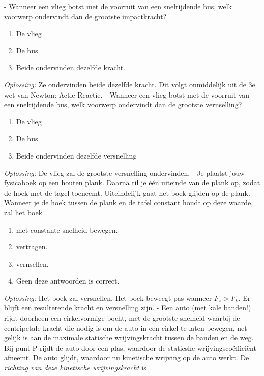 \documentclass[12pt,a4paper]{article}
\begin{document}
    \newline
    - Wanneer een vlieg botst met de voorruit van een snelrijdende bus, welk voorwerp ondervindt dan de grootste impactkracht?
    \begin{enumerate}[label=\alph*]
    	\item De vlieg
    	\item De bus
    	\item Beide ondervinden dezelfde kracht.
    \end{enumerate}
    \textit{Oplossing:} Ze ondervinden beide dezelfde kracht. Dit volgt onmiddelijk uit de 3e wet van Newton: Actie-Reactie. 
    \newline
    - Wanneer een vlieg botst met de voorruit van een snelrijdende bus, welk voorwerp ondervindt dan de grootste vernselling?
    \begin{enumerate}[label=\alph*]
    	\item De vlieg
    	\item De bus
    	\item Beide ondervinden dezelfde versnelling
    \end{enumerate}
    \textit{Oplossing:} De vlieg zal de grootste versnelling ondervinden. 
    \newline
    - Je plaatst jouw fysicaboek op een houten plank. Daarna til je één uiteinde van de plank op, zodat de hoek met de tagel toeneemt. Uiteindelijk gaat het boek glijden op de plank. Wanneer je de hoek tussen de plank en de tafel constant houdt op deze waarde, zal het boek
    \begin{enumerate}[label=\alph*]
    	\item met constante snelheid bewegen.
    	\item vertragen.
    	\item vernsellen.
    	\item Geen deze antwoorden is correct. 
    \end{enumerate}
	\textit{Oplossing:} Het boek zal versnellen. Het boek beweegt pas wanneer \(F_z > F_k\). Er blijft een resulterende kracht en versnelling zijn. 
	\newline
	- Een auto (met kale banden!) rijdt doorheen een cirkelvormige bocht, met de grootste snelheid waarbij de centripetale kracht die nodig is om de auto in een cirkel te laten bewegen, net gelijk is aan de maximale statische wrijvingskracht tussen de banden en de weg. Bij punt P rijdt de auto door een plas, waardoor de staticshe wrijvingscoëfficiënt afneemt. De auto glijdt, waardoor nu kinetische wrijving op de auto werkt. De \textit{richting van deze kinetische wrijvingskracht} is
\end{document}

